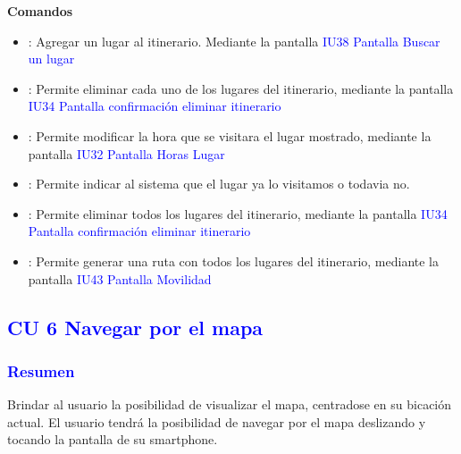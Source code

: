 \textbf{Comandos}

\begin{itemize}
    \item \fbox{+}: Agregar un lugar al itinerario. Mediante la pantalla \textcolor{blue}{IU38 Pantalla Buscar un lugar}
    
    \item {}: Permite eliminar cada uno de los lugares del itinerario, mediante la pantalla \textcolor{blue}{IU34 Pantalla confirmación eliminar itinerario}
    \item {}: Permite modificar la hora que se visitara el lugar mostrado, mediante la pantalla \textcolor{blue}{IU32 Pantalla Horas Lugar}
    \item {}: Permite indicar al sistema que el lugar ya lo visitamos o todavia no.
    \item {}: Permite eliminar todos los lugares del itinerario, mediante la pantalla \textcolor{blue}{IU34 Pantalla confirmación eliminar itinerario}
    \item {}: Permite generar una ruta con todos los lugares del itinerario, mediante la pantalla \textcolor{blue}{IU43 Pantalla Movilidad}
\end{itemize}

\newpage



\subsection{\textcolor{blue}{CU 6 Navegar por el mapa}}
\subsubsection{\textcolor{blue}{Resumen}}
Brindar al usuario la posibilidad de visualizar el mapa, centradose en su bicación actual. El usuario tendrá la posibilidad de navegar por el mapa deslizando y tocando la pantalla de su smartphone.
